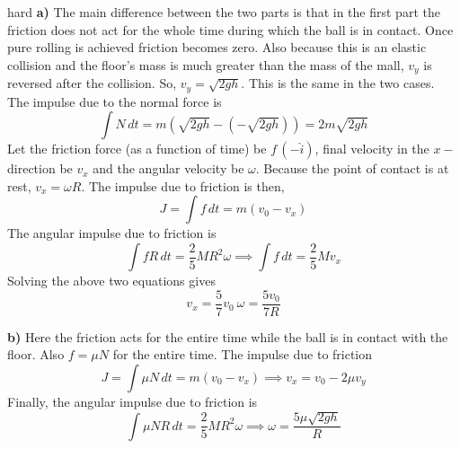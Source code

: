 \begin{solution}{hard}
\textbf{a)} The main difference between the two parts is that in the first part the friction does not act for the whole time during which the ball is in contact. Once pure rolling is achieved friction becomes zero.
Also because this is an elastic collision and the floor's mass is much greater than the mass of the mall, $v_y$ is reversed after the collision. So, $v_y = \sqrt{2gh}$. This is the same in the two cases.
The impulse due to the normal force is 
\[\int N \,dt = m(\sqrt{2gh} - (-\sqrt{2gh} )) = 2m \sqrt{2gh}\]
Let the friction force (as a function of time) be $f \, (- \hat i)$, final velocity in the $x-$ direction be $v_x$ and the angular velocity be $\omega$. Because the point of contact is at rest, $v_x=\omega R$.
The impulse due to friction is then,
$$J=\int f \,dt = m(v_0-v_x)$$
The angular impulse due to friction is 
\[\int fR \,dt = \frac{2}{5} M R^2 \omega \implies \int f \,dt = \frac{2}{5} Mv_x\]
Solving the above two equations gives $$\boxed{v_x = \frac{5}{7}v_0} \ \boxed{\omega = \frac{5v_0}{7R}}$$

\textbf{b)} Here the friction acts for the entire time while the ball is in contact with the floor. Also $f = \mu N$ for the entire time.
The impulse due to friction
$$J = \int \mu N \,dt = m(v_0-v_x) \implies \boxed{v_x = v_0-2\mu v_y}$$
Finally, the angular impulse due to friction is
$$\int \mu NR \,dt = \frac{2}{5}MR^2\omega \implies \boxed{\omega = \frac{5\mu \sqrt{2gh}}{R}}$$
\end{solution}

